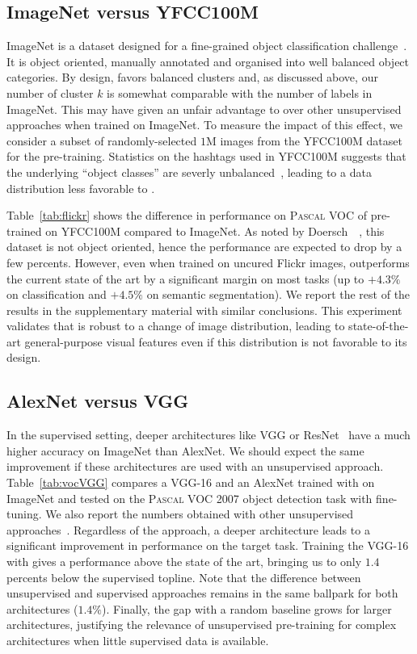 \subsection{ImageNet versus YFCC100M}

ImageNet is a dataset designed for a fine-grained object classification challenge~\cite{russakovsky2015imagenet}.
It is object oriented, manually annotated and organised into well balanced object categories.
By design, \OURS favors balanced clusters and, as discussed above, our number of cluster $k$ is somewhat comparable with the number of labels in ImageNet.
This may have given an unfair advantage to \OURS over other unsupervised approaches when trained on ImageNet.
To measure the impact of this effect, we consider a subset of randomly-selected $1$M images from the YFCC100M dataset~\cite{thomee2015new} for the pre-training.
Statistics on the hashtags used in YFCC100M suggests that the underlying ``object classes'' are severly unbalanced~\cite{joulin2016learning},
leading to a data distribution less favorable to \OURS.

Table~\ref{tab:flickr} shows the difference in performance on \textsc{Pascal} VOC of \OURS pre-trained on YFCC100M compared to ImageNet.
As noted by Doersch~\etal~\cite{doersch2015unsupervised}, this dataset is not object oriented, hence the performance are expected to drop by a few percents.
However, even when trained on uncured Flickr images, \OURS outperforms the current state of the art by a significant margin on most tasks (up to $+4.3\%$ on classification and $+4.5\%$ on semantic segmentation).
We report the rest of the results in the supplementary material with similar conclusions.
This experiment validates that \OURS is robust to a change of image distribution, leading
to state-of-the-art general-purpose visual features even if this distribution is not favorable to its design.

\subsection{AlexNet versus VGG}

In the supervised setting, deeper architectures like VGG or ResNet~\cite{he2015delving} have a much higher accuracy on ImageNet than AlexNet.
We should expect the same improvement if these architectures are used with an unsupervised approach.
Table~\ref{tab:vocVGG} compares a VGG-16 and an AlexNet trained with \OURS on ImageNet and tested on the \textsc{Pascal} VOC 2007 object detection task with fine-tuning.
We also report the numbers obtained with other unsupervised approaches~\cite{doersch2015unsupervised,wang2017transitive}.
Regardless of the approach, a deeper architecture leads to a significant improvement in performance on the target task.
Training the VGG-16 with \OURS gives a performance above the state of the art, bringing us to only $1.4$ percents below the supervised topline.
Note that the difference between unsupervised and supervised approaches remains in the same ballpark for both architectures (\ie $1.4\%$).
Finally, the gap with a random baseline grows for larger architectures,
justifying the relevance of unsupervised pre-training for complex architectures when little supervised data is available.


